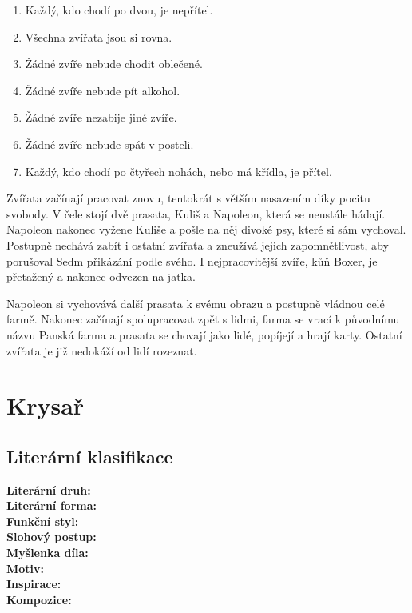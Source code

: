 \documentclass[12pt, a4paper]{article}
\newcommand{\mybf}[1]{\textcolor[RGB]{0, 179, 219}{\textbf{#1}}}
\begin{document}
\begin{center}
	\begin{minipage}{0.8\textwidth}
		\begin{enumerate}[itemsep=0.2em]
			\item Každý, kdo chodí po dvou, je nepřítel.
			\item Všechna zvířata jsou si rovna.
			\item Žádné zvíře nebude chodit oblečené.
			\item Žádné zvíře nebude pít alkohol.
			\item Žádné zvíře nezabije jiné zvíře.
			\item Žádné zvíře nebude spát v posteli.
			\item Každý, kdo chodí po čtyřech nohách, nebo má křídla, je přítel.
		\end{enumerate}
	\end{minipage}
\end{center}

Zvířata začínají pracovat znovu, tentokrát s větším nasazením díky pocitu svobody. V čele stojí dvě prasata, Kuliš a Napoleon, která se neustále hádají. Napoleon nakonec vyžene Kuliše a pošle na něj divoké psy, které si sám vychoval. Postupně nechává zabít i ostatní zvířata a zneužívá jejich zapomnětlivost, aby porušoval Sedm přikázání podle svého. I nejpracovitější zvíře, kůň Boxer, je přetažený a nakonec odvezen na jatka.

Napoleon si vychovává další prasata k svému obrazu a postupně vládnou celé farmě. Nakonec začínají spolupracovat zpět s lidmi, farma se vrací k původnímu názvu Panská farma a prasata se chovají jako lidé, popíjejí a hrají karty. Ostatní zvířata je již nedokáží od lidí rozeznat.

\newpage

\section{Krysař}

\subsection*{Literární klasifikace}
\mybf{Literární druh:} \\[3pt]
\mybf{Literární forma:} \\[3pt]
\mybf{Funkční styl:} \\[3pt]
\mybf{Slohový postup:} \\[10pt]
\mybf{Myšlenka díla:} \\[10pt]
\mybf{Motiv:} \\[10pt]
\mybf{Inspirace:} \\[10pt]
\mybf{Kompozice:} 
\end{document}

